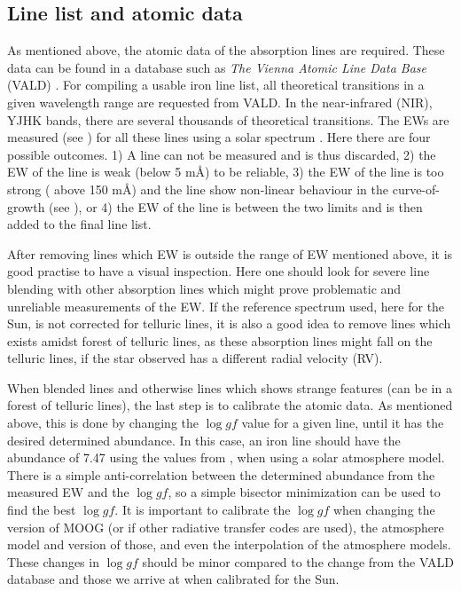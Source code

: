 \subsection{Line list and atomic data}
\label{sec:linelist}

As mentioned above, the atomic data of the absorption lines are required. These
data can be found in a database such as \emph{The Vienna Atomic Line Data Base}
(VALD) \citep{VALD1,VALD2}. For compiling a usable iron line list, all
theoretical transitions in a given wavelength range are requested from VALD. In
the near-infrared (NIR), YJHK bands, there are several thousands of theoretical
transitions. The EWs are measured (see ) for all these
lines using a solar spectrum \citep[][is used here]{Hinkle1995}. Here there are
four possible outcomes. 1) A line can not be measured and is thus discarded, 2)
the EW of the line is weak (below 5 m\AA{}) to be reliable, 3) the EW of the
line is too strong ( above 150 m\AA{}) and the line show non-linear behaviour in
the curve-of-growth (see ), or 4) the EW of the line is between
the two limits and is then added to the final line list.

After removing lines which EW is outside the range of EW mentioned above, it is
good practise to have a visual inspection. Here one should look for severe line
blending with other absorption lines which might prove problematic and
unreliable measurements of the EW. If the reference spectrum used, here for the
Sun, is not corrected for telluric lines, it is also a good idea to remove lines
which exists amidst forest of telluric lines, as these absorption lines might
fall on the telluric lines, if the star observed has a different radial velocity
(RV).

When blended lines and otherwise lines which shows strange features (can be in a
forest of telluric lines), the last step is to calibrate the atomic data. As
mentioned above, this is done by changing the $\log \mathit{gf}$ value for a
given line, until it has the desired determined abundance. In this case, an iron
line should have the abundance of 7.47 using the values from
\citet{Gonzalez2000}, when using a solar atmosphere model. There is a simple
anti-correlation between the determined abundance from the measured EW and the
$\log \mathit{gf}$, so a simple bisector minimization can be used to find the
best $\log \mathit{gf}$. It is important to calibrate the $\log \mathit{gf}$
when changing the version of MOOG (or if other radiative transfer codes are
used), the atmosphere model and version of those, and even the interpolation of
the atmosphere models. These changes in $\log \mathit{gf}$ should be minor
compared to the change from the VALD database and those we arrive at when
calibrated for the Sun.



